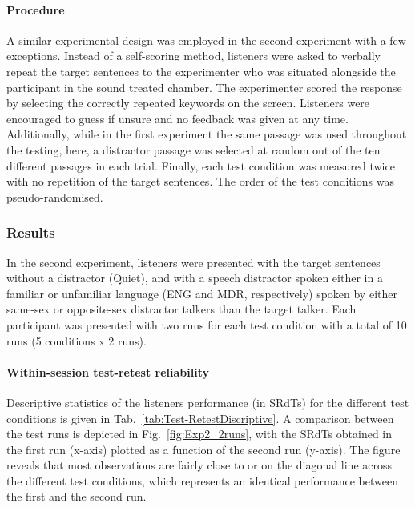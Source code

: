 \documentclass[a4paper, twoside]{templates/ociamthesis}
\begin{document}
\hypertarget{procedure-1}{%
\paragraph{Procedure}\label{procedure-1}}

\hfill\break
A similar experimental design was employed in the second experiment with a few exceptions. Instead of a self-scoring method, listeners were asked to verbally repeat the target sentences to the experimenter who was situated alongside the participant in the sound treated chamber. The experimenter scored the response by selecting the correctly repeated keywords on the screen. Listeners were encouraged to guess if unsure and no feedback was given at any time. Additionally, while in the first experiment the same passage was used throughout the testing, here, a distractor passage was selected at random out of the ten different passages in each trial. Finally, each test condition was measured twice with no repetition of the target sentences. The order of the test conditions was pseudo-randomised.\\

\hypertarget{results-1}{%
\subsubsection{Results}\label{results-1}}

In the second experiment, listeners were presented with the target sentences without a distractor (Quiet), and with a speech distractor spoken either in a familiar or unfamiliar language (ENG and MDR, respectively) spoken by either same-sex or opposite-sex distractor talkers than the target talker. Each participant was presented with two runs for each test condition with a total of 10 runs (5 conditions x 2 runs).\\

\hypertarget{within-session-test-retest-reliability}{%
\paragraph{Within-session test-retest reliability}\label{within-session-test-retest-reliability}}

\hfill\break
Descriptive statistics of the listeners performance (in SRdTs) for the different test conditions is given in Tab.~\ref{tab:Test-RetestDiscriptive}. A comparison between the test runs is depicted in Fig.~\ref{fig:Exp2_2runs}, with the SRdTs obtained in the first run (x-axis) plotted as a function of the second run (y-axis). The figure reveals that most observations are fairly close to or on the diagonal line across the different test conditions, which represents an identical performance between the first and the second run.\\
\end{document}
